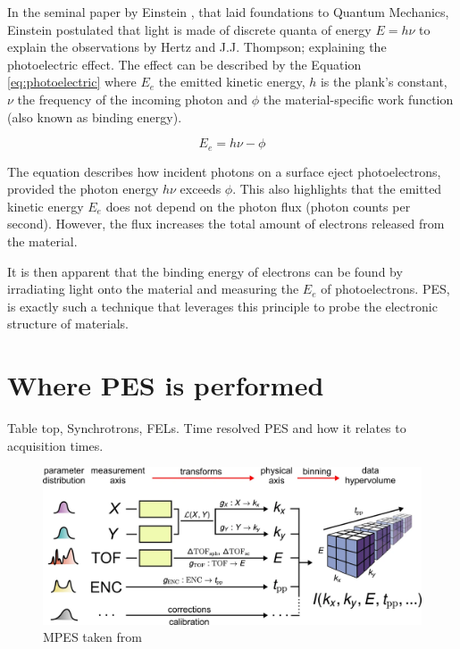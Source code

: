 In the seminal paper by Einstein \cite{einstein_uber_1905}, that laid foundations to Quantum Mechanics, Einstein postulated that light is made of discrete quanta of energy $E = h\nu$ to explain the observations by Hertz and J.J. Thompson; explaining the photoelectric effect. The effect can be described by the Equation \ref{eq:photoelectric} where $E_e$ the emitted kinetic energy, $h$ is the plank's constant, $\nu$ the frequency of the incoming photon and  $\phi$ the material-specific work function (also known as binding energy).

\begin{equation}\label{eq:photoelectric}
    E_e = h\nu - \phi
\end{equation}

The equation describes how incident photons on a surface eject photoelectrons, provided the photon energy $h\nu$ exceeds $\phi$. This also highlights that the emitted kinetic energy $E_e$ does not depend on the photon flux (photon counts per second). However, the flux increases the total amount of electrons released from the material.

It is then apparent that the binding energy of electrons can be found by irradiating light onto the material and measuring the $E_e$ of photoelectrons. \gls{PES}, is exactly such a technique that leverages this principle to probe the electronic structure of materials.

\section{Where PES is performed}
Table top, Synchrotrons, FELs. Time resolved PES and how it relates to acquisition times.

\begin{figure}
    \centering
    \includegraphics[width=1\linewidth]{images/2024-08-25-22-36-44.png}
    \caption{MPES taken from \cite{xian_open-source_2020}}
\end{figure}



